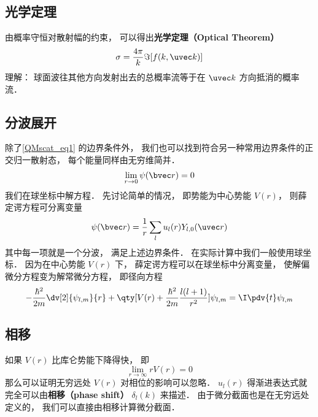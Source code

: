 \subsection{光学定理}
由概率守恒对散射幅的约束， 可以得出\textbf{光学定理（Optical Theorem）}
\begin{equation}
\sigma = \frac{4\pi}{k} \Im[f(k, \uvec k)]
\end{equation}
理解： 球面波往其他方向发射出去的总概率流等于在 $\uvec k$ 方向抵消的概率流．

\subsection{分波展开}

除了\autoref{QMscat_eq1} 的边界条件外， 我们也可以找到符合另一种常用边界条件的正交归一散射态， 每个能量同样由无穷维简并．
\begin{equation}
\lim_{r\to 0} \psi(\bvec r) = 0
\end{equation}
我们在球坐标中解方程． 先讨论简单的情况， 即势能为中心势能 $V(r)$， 则薛定谔方程可分离变量 %
\begin{equation}
\psi(\bvec r) = \frac{1}{r} \sum_l u_l(r) Y_{l,0}(\uvec r)
\end{equation}
其中每一项就是一个分波， 满足上述边界条件． 在实际计算中我们一般使用球坐标． 因为在中心势能 $V(r)$ 下， 薛定谔方程可以在球坐标中分离变量， 使解偏微分方程变为解常微分方程， 即径向方程 %
\begin{equation}
-\frac{\hbar^2}{2m} \dv[2]{\psi_{l,m}}{r} + \qty[V(r) + \frac{\hbar^2}{2m}\frac{l(l + 1)}{r^2}]\psi_{l,m} = \I \pdv{t} \psi_{l,m}
\end{equation}

\subsection{相移}
如果 $V(r)$ 比库仑势能下降得快， 即
\begin{equation}
\lim_{r\to\infty} r V(r) = 0
\end{equation}
那么可以证明无穷远处 $V(r)$ 对相位的影响可以忽略． $u_l(r)$ 得渐进表达式就完全可以由\textbf{相移（phase shift）} $\delta_l(k)$ 来描述． 由于微分截面也是在无穷远处定义的， 我们可以直接由相移计算微分截面．

